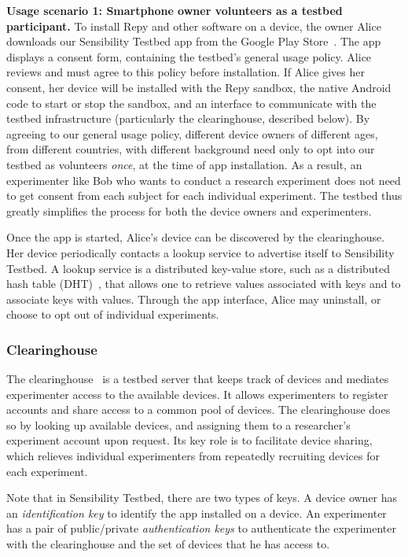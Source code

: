 \textbf{Usage scenario 1: Smartphone owner volunteers as a testbed participant.}
To install Repy and other software on a device, the owner Alice downloads 
our Sensibility Testbed app from the Google Play Store~\cite{sensibility-app}.
The app displays a consent form,  containing the testbed's 
general usage policy. Alice reviews and must agree to this 
policy before installation. If Alice gives her consent, her device will be 
installed with the Repy sandbox, the native Android code to 
start or stop the sandbox, and an interface to communicate with the testbed 
infrastructure (particularly the clearinghouse, described below). 
By agreeing to our general usage policy, different device 
owners of different ages, from different countries, with different
background need only to opt into our testbed as 
volunteers \textit{once}, at the time of app installation. As a result, an 
experimenter like Bob who wants to conduct a research experiment 
does not need to get consent from each subject for each individual
experiment. The testbed thus greatly simplifies the process for both the 
device owners and experimenters. 

Once the app is started, Alice's device can be
discovered by the clearinghouse. Her device periodically contacts 
a lookup service to advertise itself to Sensibility Testbed. 
A lookup service is a distributed key-value store, such as a 
distributed hash table (DHT)~\cite{dht}, that 
allows one to retrieve values associated with keys and to associate 
keys with values. Through the app interface, Alice may uninstall, or 
choose to opt out of individual experiments.

\subsubsection{Clearinghouse}\label{sec-ch}
The clearinghouse~\cite{ch} is a testbed server that keeps 
track of devices and mediates experimenter access to the 
available devices. It allows experimenters to register 
accounts and share access to a common pool of devices.
The clearinghouse does so by looking up available devices, and assigning
them to a researcher's experiment account upon request. 
Its key role is to facilitate device sharing, 
which relieves individual experimenters from repeatedly 
recruiting devices for each experiment.

Note that in Sensibility Testbed, there are two types of keys. A device
owner has an \textit{identification key} to identify the app installed on a 
device. An experimenter has a pair of public/private \textit{authentication 
keys} to authenticate the experimenter with the clearinghouse and 
the set of devices that he has access to.

